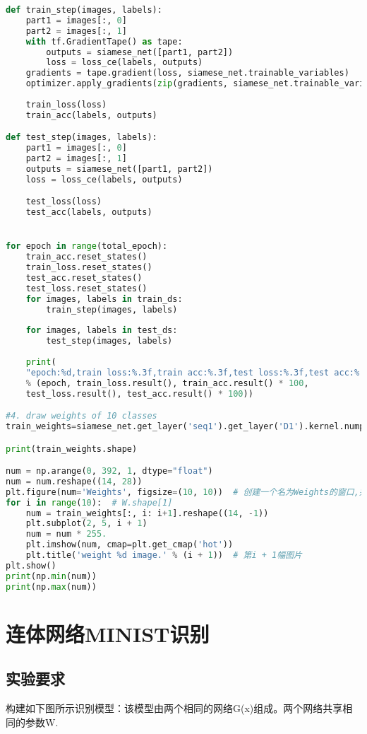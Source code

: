 \documentclass{article}
\begin{document}
\begin{lstlisting}[language=Python]
def train_step(images, labels):
	part1 = images[:, 0]
	part2 = images[:, 1]
	with tf.GradientTape() as tape:
		outputs = siamese_net([part1, part2])
		loss = loss_ce(labels, outputs)
	gradients = tape.gradient(loss, siamese_net.trainable_variables)
	optimizer.apply_gradients(zip(gradients, siamese_net.trainable_variables))
	
	train_loss(loss)
	train_acc(labels, outputs)

def test_step(images, labels):
	part1 = images[:, 0]
	part2 = images[:, 1]
	outputs = siamese_net([part1, part2])
	loss = loss_ce(labels, outputs)

	test_loss(loss)
	test_acc(labels, outputs)


for epoch in range(total_epoch):
	train_acc.reset_states()
	train_loss.reset_states()
	test_acc.reset_states()
	test_loss.reset_states()
	for images, labels in train_ds:
		train_step(images, labels)
	
	for images, labels in test_ds:
		test_step(images, labels)
	
	print(
	"epoch:%d,train loss:%.3f,train acc:%.3f,test loss:%.3f,test acc:%.3f"
	% (epoch, train_loss.result(), train_acc.result() * 100,
	test_loss.result(), test_acc.result() * 100))

#4. draw weights of 10 classes
train_weights=siamese_net.get_layer('seq1').get_layer('D1').kernel.numpy()

print(train_weights.shape)

num = np.arange(0, 392, 1, dtype="float")
num = num.reshape((14, 28))
plt.figure(num='Weights', figsize=(10, 10))  # 创建一个名为Weights的窗口,并设置大小
for i in range(10):  # W.shape[1]
	num = train_weights[:, i: i+1].reshape((14, -1))
	plt.subplot(2, 5, i + 1)
	num = num * 255.
	plt.imshow(num, cmap=plt.get_cmap('hot'))
	plt.title('weight %d image.' % (i + 1))  # 第i + 1幅图片
plt.show()
print(np.min(num))
print(np.max(num))

\end{lstlisting}

        

\section{连体网络MINIST识别}

	\subsection{实验要求}
	
		构建如下图所示识别模型：该模型由两个相同的网络G(x)组成。两个网络共享相同的参数W.
		
\end{document}
